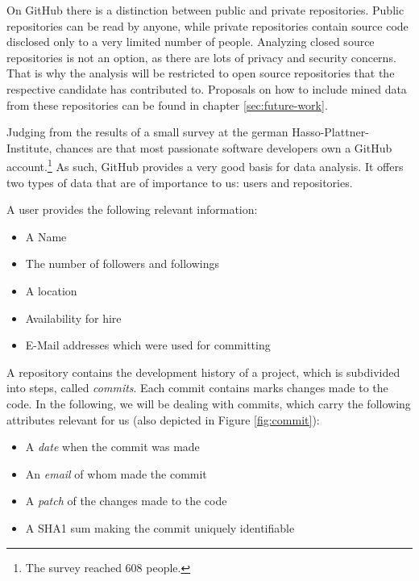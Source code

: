 On GitHub there is a distinction between public and private repositories. Public repositories can be read by anyone, while private repositories contain source code disclosed only to a very limited number of people. Analyzing closed source repositories is not an option, as there are lots of privacy and security concerns. That is why the analysis will be restricted to open source repositories that the respective candidate has contributed to. Proposals on how to include mined data from these repositories can be found in chapter \ref{sec:future-work}.
\newline


Judging from the results of a small survey at the german Hasso-Plattner-Institute, chances are that most passionate software developers own a GitHub account.\footnote{The survey reached 608 people.}
As such, GitHub provides a very good basis for data analysis. It offers two types of data that are of importance to us: users and repositories.
\newline

A user provides the following relevant information:
\begin{itemize}
  \item A Name
  \item The number of followers and followings
  \item A location
  \item Availability for hire
  \item E-Mail addresses which were used for committing
\end{itemize}
\vspace{1em}

\noindent A repository contains the development history of a project, which is subdivided into steps, called \textit{commits}. Each commit contains marks changes made to the code. In the following, we will be dealing with commits, which carry the following attributes relevant for us (also depicted in Figure \ref{fig:commit}):

\begin{itemize}
    \item A \textit{date} when the commit was made
    \item An \textit{email} of whom made the commit
    \item A \textit{patch} of the changes made to the code
    \item A SHA1 sum making the commit uniquely identifiable
\end{itemize}

